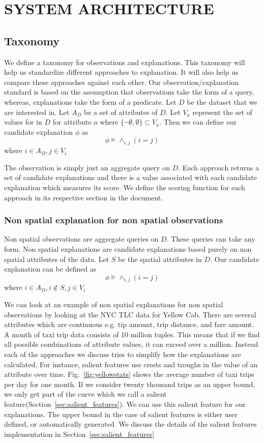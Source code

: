 \chapter{SYSTEM ARCHITECTURE}
\label{chp:architecture}
\section{Taxonomy}
\label{sec:taxonomy}
We define a taxonomy for observations and explanations. This taxonomy will help us standardize different approaches to explanation. It will also help us compare these approaches against each other. Our observation/explanation standard is based on the assumption that observations take the form of a query, whereas, explanations take the form of a predicate. Let $D$ be the dataset that we are interested in. Let $A_D$ be a set of attributes of $D$. Let $V_a$ represent the set of values for in $D$ for attribute $a$ where $\{\neg \emptyset,\emptyset\} \subset V_a$. Then we can define our candidate explanation $\phi$ as $$\phi \models \wedge_{i,j} {(i=j)}$$ where $i \in A_D, j \in V_i $

The observation is simply just an aggregate query on $D$. Each approach returns a set of candidate explanations and there is a value associated with each candidate explanation which measures its score. We define the scoring function for each approach in its respective section in the document.

\subsection{Non spatial explanation for non spatial observations}
\label{sec:nonspatial_nonspatial}

Non spatial observations are aggregate queries on $D$. These queries can take any form. Non spatial explanations are candidate explanations based purely on non spatial attributes of the data. Let $S$ be the spatial attributes in $D$. Our candidate explanation can be defined as
$$\phi \models \wedge_{i,j} {(i=j)}$$
where $i \in A_D, i \notin S, j \in V_i$

We can look at an example of non spatial explanations for non spatial observations by looking at the NYC TLC data for Yellow Cab. There are several attributes which are continuous e.g. tip amount, trip distance, and fare amount. A month of taxi trip data consists of 10 million tuples. This means that if we find all possible combinations of attribute values, it can exceed over a million. Instead each of the approaches we discuss tries to simplify how the explanations are calculated. For instance, salient features use crests and troughs in the value of an attribute over time. Fig.~\ref{fig:yellowstats} shows the average number of taxi trips per day for one month. If we consider twenty thousand trips as an upper bound, we only get part of the curve which we call a salient feature(Section~\ref{sec:salient_features}). We can use this salient feature for our explanations. The upper bound in the case of salient features is either user defined, or automatically generated. We discuss the details of the salient features implementation in Section~\ref{sec:salient_features}


